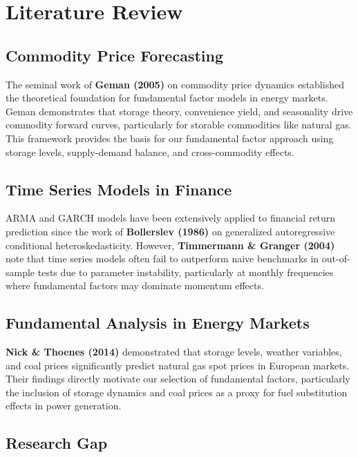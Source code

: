 \documentclass[12pt,a4paper]{article}
\begin{document}
\newpage
\section{Literature Review}

\subsection{Commodity Price Forecasting}

The seminal work of \textbf{Geman (2005)} on commodity price dynamics established the theoretical foundation for fundamental factor models in energy markets. Geman demonstrates that storage theory, convenience yield, and seasonality drive commodity forward curves, particularly for storable commodities like natural gas. This framework provides the basis for our fundamental factor approach using storage levels, supply-demand balance, and cross-commodity effects.

\subsection{Time Series Models in Finance}

ARMA and GARCH models have been extensively applied to financial return prediction since the work of \textbf{Bollerslev (1986)} on generalized autoregressive conditional heteroskedasticity. However, \textbf{Timmermann \& Granger (2004)} note that time series models often fail to outperform naive benchmarks in out-of-sample tests due to parameter instability, particularly at monthly frequencies where fundamental factors may dominate momentum effects.

\subsection{Fundamental Analysis in Energy Markets}

\textbf{Nick \& Thoenes (2014)} demonstrated that storage levels, weather variables, and coal prices significantly predict natural gas spot prices in European markets. Their findings directly motivate our selection of fundamental factors, particularly the inclusion of storage dynamics and coal prices as a proxy for fuel substitution effects in power generation.

\subsection{Research Gap}
\end{document}
